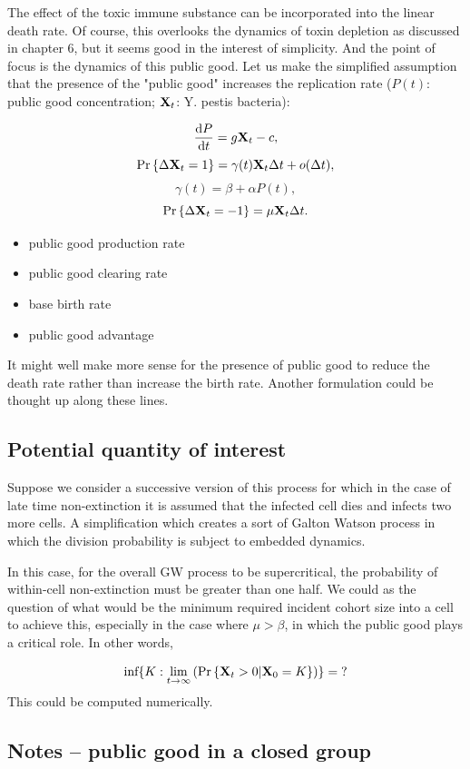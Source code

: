 The effect of the toxic immune substance can be incorporated into the linear death rate.  Of course, this overlooks the dynamics of toxin depletion as discussed in chapter 6,  but it seems good in the interest of simplicity.  And the point of focus is the dynamics of this public good.  Let us make the simplified assumption that the presence of the "public good" increases the replication rate ($P(t)$: public good concentration; ${{\bf X}_t}$: Y. pestis bacteria): 


$$\displaystyle\frac{{\rm d} P}{{\rm d} t} = g {{\bf X}_t} - c,$$
$${\text{Pr}\left\{\Delta {{\bf X}_t} = 1\right\}} = \gamma(t){{\bf X}_t}\Delta t + o(\Delta t),$$
$$\gamma(t) = \beta + \alpha P(t),$$
$${\text{Pr}\left\{\Delta {{\bf X}_t} = -1\right\}} = \mu {{\bf X}_t} \Delta t.$$

\begin{itemize}
\item[$g$:] public good production rate
\item[$c$:] public good clearing rate
\item[$\beta$:] base birth rate
\item[$\alpha$:] public good advantage
\end{itemize}
It might well make more sense for the presence of public good to reduce the death rate rather than increase the birth rate.  Another formulation could be thought up along these lines. \par 

\subsection*{Potential quantity of interest}

Suppose we consider a successive version of this process for which in the case of late time non-extinction it is assumed that the infected cell dies and infects two more cells.  A simplification which creates a sort of Galton Watson process in which the division probability is subject to embedded dynamics.\par 
In this case,  for the overall GW process to be supercritical,  the probability of within-cell non-extinction must be greater than one half.  We could as the question of what would be the minimum required incident cohort size into a cell to achieve this,  especially in the case where $\mu > \beta$, in which the public good plays a critical role.  In other words, 

$$\text{inf}\{K : \lim_{t\to\infty}\left({\text{Pr}\left\{{{\bf X}_t} > 0 | {\bf X}_0 = K \right\}}\right)\} = \text{?}$$
This could be computed numerically. 


\subsection*{Notes -- public good in a closed group}

